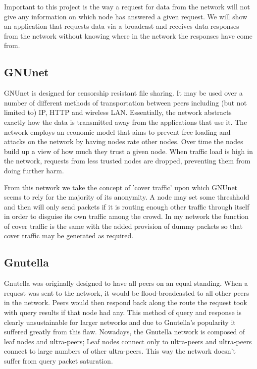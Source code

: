 \documentclass[ %
                    author={Luke Murray},
                supervisor={Dr. Simon Hollis},
                     title={Shadow Peer-to-Peer Networks},
                  subtitle={},
                    degree={MEng},
                      year={2013} ]{thesis}
\begin{document}
Important to this project is the way a request for data from the network will not give any information on which node has answered a given request. We will show an application that requests data via a broadcast and receives data responses from the network without knowing where in the network the responses have come from. 

\subsection{GNUnet}

GNUnet\cite{GNUnet} is designed for censorship resistant file sharing. It may be used over a number of different methods of transportation between peers including (but not limited to) IP, HTTP and wireless LAN. Essentially, the network abstracts exactly how the data is transmitted away from the applications that use it. The network employs an economic model that aims to prevent free-loading and attacks on the network by having nodes rate other nodes. Over time the nodes build up a view of how much they trust a given node. When traffic load is high in the network, requests from less trusted nodes are dropped, preventing them from doing further harm.

From this network we take the concept of 'cover traffic' upon which GNUnet seems to rely for the majority of its anonymity. A node may set some threshhold and then will only send packets if it is routing enough other traffic through itself in order to disguise its own traffic among the crowd. In my network the function of cover traffic is the same with the added provision of dummy packets so that cover traffic may be generated as required.

\subsection{Gnutella}

Gnutella\cite{Gnutella} was originally designed to have all peers on an equal standing. When a request was sent to the network, it would be flood-broadcasted to all other peers in the network. Peers would then respond back along the route the request took with query results if that node had any. This method of query and response is clearly unsustainable for larger networks and due to Gnutella's  popularity it suffered greatly from this flaw. Nowadays, the Gnutella network is composed of leaf nodes and ultra-peers; Leaf nodes connect only to ultra-peers and ultra-peers connect to large numbers of other ultra-peers. This way the network doesn't suffer from query packet saturation.
\end{document}
